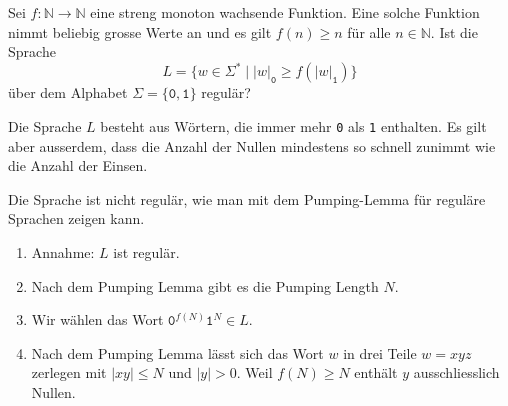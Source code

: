 Sei $f\colon \mathbb{N}\to\mathbb{N}$ eine streng monoton wachsende Funktion.
Eine solche Funktion nimmt beliebig grosse Werte an und es 
gilt $f(n) \ge n$ für alle $n\in\mathbb{N}$.
Ist die Sprache
\[
L=
\{
w\in\Sigma^*
\;|\;
|w|_{\texttt{0}}
\ge f(|w|_{\texttt{1}})
\}
\]
über dem Alphabet $\Sigma=\{\texttt{0},\texttt{1}\}$ regulär?

\begin{hinweis}
Die Sprache $L$ besteht aus Wörtern, die immer mehr \texttt{0} als \texttt{1}
enthalten.
Es gilt aber ausserdem, dass die Anzahl der Nullen mindestens so schnell
zunimmt wie die Anzahl der Einsen.
\end{hinweis}

\begin{loesung}
Die Sprache ist nicht regulär, wie man mit dem Pumping-Lemma für
reguläre Sprachen zeigen kann.
\begin{enumerate}
\item Annahme: $L$ ist regulär.
\item Nach dem Pumping Lemma gibt es die Pumping Length $N$.
\item Wir wählen das Wort $\texttt{0}^{f(N)}\texttt{1}^N\in L$.
\item Nach dem Pumping Lemma lässt sich das Wort $w$ in drei Teile
$w=xyz$
zerlegen mit $|xy|\le N$ und $|y|>0$.
Weil $f(N)\ge N$ enthält $y$ ausschliesslich Nullen.
\begin{center}
\end{center}
\end{enumerate}
\end{loesung}
